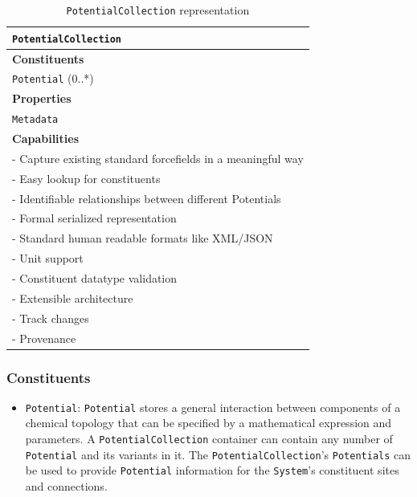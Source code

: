 \documentclass[12pt]{article}
\begin{document}
\begin{table}[ht]
    \centering
     \caption{\texttt{PotentialCollection} representation}
    \begin{tabular}{|l|}
         \hline
         \rowcolor{gray!50}
         \texttt{PotentialCollection}  \\
         \hline
         \textbf{Constituents} \\
         \texttt{Potential} (0..*)\\
         \hline
         \textbf{Properties}\\
         \texttt{Metadata} \\
         \hline
         \textbf{Capabilities}\\
         \hline
         - Capture existing standard forcefields in a meaningful way\\
         - Easy lookup for constituents\\
         - Identifiable relationships between different Potentials\\
         - Formal serialized representation \\
         - Standard human readable formats like XML/JSON \\
         - Unit support\\
         - Constituent datatype validation\\
         - Extensible architecture\\
         - Track changes\\
         - Provenance \\
        \hline
    \end{tabular}
    \label{tab:ForceFieldSpec}
\end{table}

\subsubsection{Constituents}
\begin{itemize}
    \item \texttt{Potential}: \texttt{Potential} stores a general interaction between components of a chemical topology that can be specified by a mathematical expression and parameters. A \texttt{PotentialCollection} container can contain any number of \texttt{Potential} and its variants in it. The \texttt{PotentialCollection}'s \texttt{Potentials} can be used to provide \texttt{Potential} information for the \texttt{System}'s constituent sites and connections.
\end{itemize}
\end{document}

